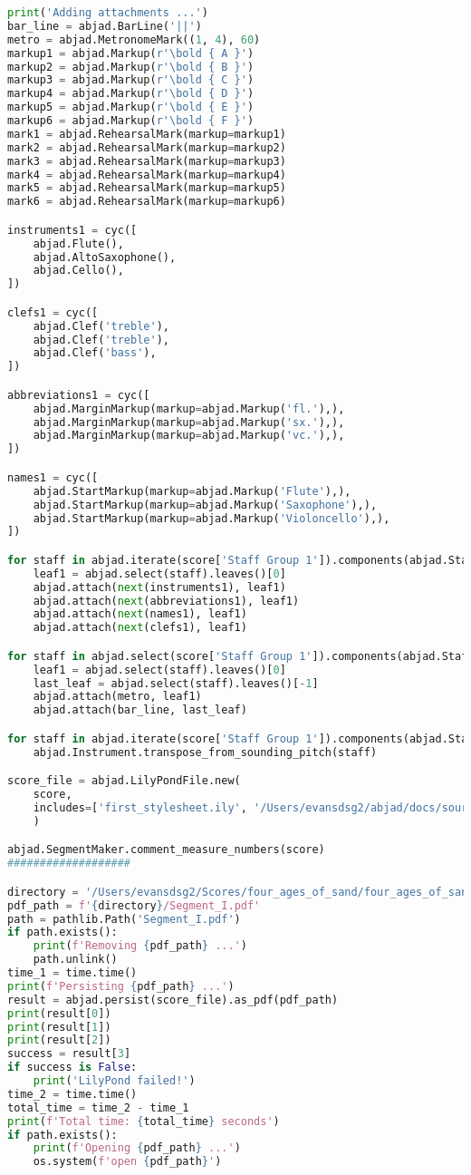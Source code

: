\begin{lstlisting}[language=Python, caption=Four Ages of Sand Segment\_I]
print('Adding attachments ...')
bar_line = abjad.BarLine('||')
metro = abjad.MetronomeMark((1, 4), 60)
markup1 = abjad.Markup(r'\bold { A }')
markup2 = abjad.Markup(r'\bold { B }')
markup3 = abjad.Markup(r'\bold { C }')
markup4 = abjad.Markup(r'\bold { D }')
markup5 = abjad.Markup(r'\bold { E }')
markup6 = abjad.Markup(r'\bold { F }')
mark1 = abjad.RehearsalMark(markup=markup1)
mark2 = abjad.RehearsalMark(markup=markup2)
mark3 = abjad.RehearsalMark(markup=markup3)
mark4 = abjad.RehearsalMark(markup=markup4)
mark5 = abjad.RehearsalMark(markup=markup5)
mark6 = abjad.RehearsalMark(markup=markup6)

instruments1 = cyc([
    abjad.Flute(),
    abjad.AltoSaxophone(),
    abjad.Cello(),
])

clefs1 = cyc([
    abjad.Clef('treble'),
    abjad.Clef('treble'),
    abjad.Clef('bass'),
])

abbreviations1 = cyc([
    abjad.MarginMarkup(markup=abjad.Markup('fl.'),),
    abjad.MarginMarkup(markup=abjad.Markup('sx.'),),
    abjad.MarginMarkup(markup=abjad.Markup('vc.'),),
])

names1 = cyc([
    abjad.StartMarkup(markup=abjad.Markup('Flute'),),
    abjad.StartMarkup(markup=abjad.Markup('Saxophone'),),
    abjad.StartMarkup(markup=abjad.Markup('Violoncello'),),
])

for staff in abjad.iterate(score['Staff Group 1']).components(abjad.Staff):
    leaf1 = abjad.select(staff).leaves()[0]
    abjad.attach(next(instruments1), leaf1)
    abjad.attach(next(abbreviations1), leaf1)
    abjad.attach(next(names1), leaf1)
    abjad.attach(next(clefs1), leaf1)

for staff in abjad.select(score['Staff Group 1']).components(abjad.Staff)[0]:
    leaf1 = abjad.select(staff).leaves()[0]
    last_leaf = abjad.select(staff).leaves()[-1]
    abjad.attach(metro, leaf1)
    abjad.attach(bar_line, last_leaf)

for staff in abjad.iterate(score['Staff Group 1']).components(abjad.Staff):
    abjad.Instrument.transpose_from_sounding_pitch(staff)

score_file = abjad.LilyPondFile.new(
    score,
    includes=['first_stylesheet.ily', '/Users/evansdsg2/abjad/docs/source/_stylesheets/abjad.ily'],
    )

abjad.SegmentMaker.comment_measure_numbers(score)
###################

directory = '/Users/evansdsg2/Scores/four_ages_of_sand/four_ages_of_sand/Segments/Segment_I'
pdf_path = f'{directory}/Segment_I.pdf'
path = pathlib.Path('Segment_I.pdf')
if path.exists():
    print(f'Removing {pdf_path} ...')
    path.unlink()
time_1 = time.time()
print(f'Persisting {pdf_path} ...')
result = abjad.persist(score_file).as_pdf(pdf_path)
print(result[0])
print(result[1])
print(result[2])
success = result[3]
if success is False:
    print('LilyPond failed!')
time_2 = time.time()
total_time = time_2 - time_1
print(f'Total time: {total_time} seconds')
if path.exists():
    print(f'Opening {pdf_path} ...')
    os.system(f'open {pdf_path}')
\end{lstlisting}
\doublespace

